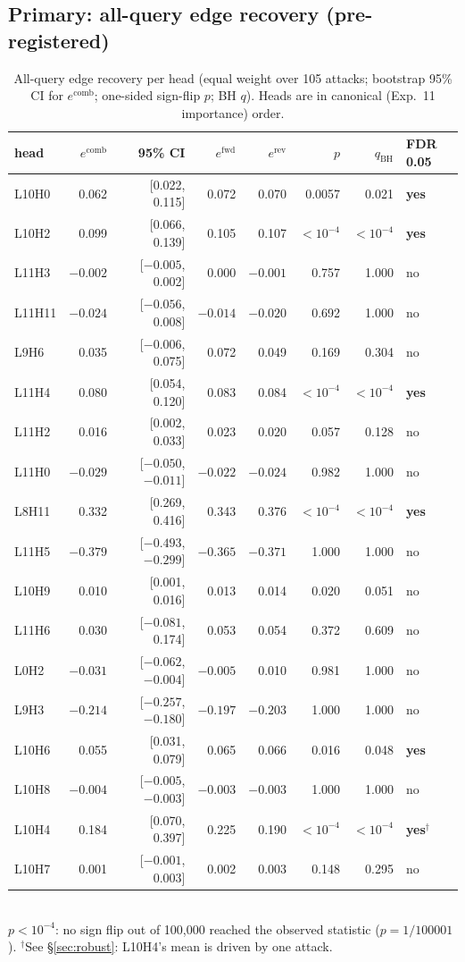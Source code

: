 \documentclass[11pt]{article}
\newcommand{\fwd}{\ensuremath{e^{\mathrm{fwd}}}}
\newcommand{\rev}{\ensuremath{e^{\mathrm{rev}}}}
\newcommand{\comb}{\ensuremath{e^{\mathrm{comb}}}}
\begin{document}
\subsection{Primary: all-query edge recovery (pre-registered)}
\begin{table}[H]\centering\small
\caption{All-query edge recovery per head (equal weight over 105 attacks;
bootstrap 95\% CI for \comb; one-sided sign-flip $p$; BH $q$). Heads are in
canonical (Exp.~11 importance) order.}
\label{tab:main}
\begin{tabular}{lrrrrrrl}
\toprule
head & \comb & 95\% CI & \fwd & \rev & $p$ & $q_{\text{BH}}$ & FDR 0.05\\
\midrule
L10H0 & 0.062 & [0.022, 0.115] & 0.072 & 0.070 & 0.0057 & 0.021 & \textbf{yes}\\
L10H2 & 0.099 & [0.066, 0.139] & 0.105 & 0.107 & $<10^{-4}$ & $<10^{-4}$ & \textbf{yes}\\
L11H3 & $-0.002$ & [$-0.005$, 0.002] & 0.000 & $-0.001$ & 0.757 & 1.000 & no\\
L11H11 & $-0.024$ & [$-0.056$, 0.008] & $-0.014$ & $-0.020$ & 0.692 & 1.000 & no\\
L9H6 & 0.035 & [$-0.006$, 0.075] & 0.072 & 0.049 & 0.169 & 0.304 & no\\
L11H4 & 0.080 & [0.054, 0.120] & 0.083 & 0.084 & $<10^{-4}$ & $<10^{-4}$ & \textbf{yes}\\
L11H2 & 0.016 & [0.002, 0.033] & 0.023 & 0.020 & 0.057 & 0.128 & no\\
L11H0 & $-0.029$ & [$-0.050$, $-0.011$] & $-0.022$ & $-0.024$ & 0.982 & 1.000 & no\\
L8H11 & 0.332 & [0.269, 0.416] & 0.343 & 0.376 & $<10^{-4}$ & $<10^{-4}$ & \textbf{yes}\\
L11H5 & $-0.379$ & [$-0.493$, $-0.299$] & $-0.365$ & $-0.371$ & 1.000 & 1.000 & no\\
L10H9 & 0.010 & [0.001, 0.016] & 0.013 & 0.014 & 0.020 & 0.051 & no\\
L11H6 & 0.030 & [$-0.081$, 0.174] & 0.053 & 0.054 & 0.372 & 0.609 & no\\
L0H2 & $-0.031$ & [$-0.062$, $-0.004$] & $-0.005$ & 0.010 & 0.981 & 1.000 & no\\
L9H3 & $-0.214$ & [$-0.257$, $-0.180$] & $-0.197$ & $-0.203$ & 1.000 & 1.000 & no\\
L10H6 & 0.055 & [0.031, 0.079] & 0.065 & 0.066 & 0.016 & 0.048 & \textbf{yes}\\
L10H8 & $-0.004$ & [$-0.005$, $-0.003$] & $-0.003$ & $-0.003$ & 1.000 & 1.000 & no\\
L10H4 & 0.184 & [0.070, 0.397] & 0.225 & 0.190 & $<10^{-4}$ & $<10^{-4}$ & \textbf{yes}$^\dagger$\\
L10H7 & 0.001 & [$-0.001$, 0.003] & 0.002 & 0.003 & 0.148 & 0.295 & no\\
\bottomrule
\end{tabular}\\[2pt]
{\footnotesize $p<10^{-4}$: no sign flip out of 100{,}000 reached the observed
statistic ($p=1/100001$). $^\dagger$See \S\ref{sec:robust}: L10H4's mean is
driven by one attack.}
\end{table}
\end{document}
